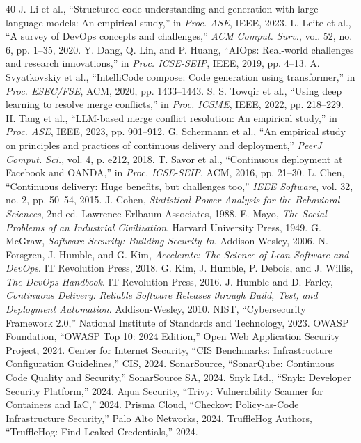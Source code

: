 \documentclass[journal]{IEEEtran}
\begin{document}
\begin{thebibliography}{40}
 J. Li et al., ``Structured code understanding and generation with large language models: An empirical study,'' in \textit{Proc. ASE}, IEEE, 2023.
 L. Leite et al., ``A survey of DevOps concepts and challenges,'' \textit{ACM Comput. Surv.}, vol. 52, no. 6, pp. 1--35, 2020.
 Y. Dang, Q. Lin, and P. Huang, ``AIOps: Real-world challenges and research innovations,'' in \textit{Proc. ICSE-SEIP}, IEEE, 2019, pp. 4--13.
 A. Svyatkovskiy et al., ``IntelliCode compose: Code generation using transformer,'' in \textit{Proc. ESEC/FSE}, ACM, 2020, pp. 1433--1443.
 S. S. Towqir et al., ``Using deep learning to resolve merge conflicts,'' in \textit{Proc. ICSME}, IEEE, 2022, pp. 218--229.
 H. Tang et al., ``LLM-based merge conflict resolution: An empirical study,'' in \textit{Proc. ASE}, IEEE, 2023, pp. 901--912.
 G. Schermann et al., ``An empirical study on principles and practices of continuous delivery and deployment,'' \textit{PeerJ Comput. Sci.}, vol. 4, p. e212, 2018.
 T. Savor et al., ``Continuous deployment at Facebook and OANDA,'' in \textit{Proc. ICSE-SEIP}, ACM, 2016, pp. 21--30.
 L. Chen, ``Continuous delivery: Huge benefits, but challenges too,'' \textit{IEEE Software}, vol. 32, no. 2, pp. 50--54, 2015.
 J. Cohen, \textit{Statistical Power Analysis for the Behavioral Sciences}, 2nd ed. Lawrence Erlbaum Associates, 1988.
 E. Mayo, \textit{The Social Problems of an Industrial Civilization}. Harvard University Press, 1949.
 G. McGraw, \textit{Software Security: Building Security In}. Addison-Wesley, 2006.
 N. Forsgren, J. Humble, and G. Kim, \textit{Accelerate: The Science of Lean Software and DevOps}. IT Revolution Press, 2018.
 G. Kim, J. Humble, P. Debois, and J. Willis, \textit{The DevOps Handbook}. IT Revolution Press, 2016.
 J. Humble and D. Farley, \textit{Continuous Delivery: Reliable Software Releases through Build, Test, and Deployment Automation}. Addison-Wesley, 2010.
 NIST, ``Cybersecurity Framework 2.0,'' National Institute of Standards and Technology, 2023.
 OWASP Foundation, ``OWASP Top 10: 2024 Edition,'' Open Web Application Security Project, 2024.
 Center for Internet Security, ``CIS Benchmarks: Infrastructure Configuration Guidelines,'' CIS, 2024.
 SonarSource, ``SonarQube: Continuous Code Quality and Security,'' SonarSource SA, 2024.
 Snyk Ltd., ``Snyk: Developer Security Platform,'' 2024.
 Aqua Security, ``Trivy: Vulnerability Scanner for Containers and IaC,'' 2024.
 Prisma Cloud, ``Checkov: Policy-as-Code Infrastructure Security,'' Palo Alto Networks, 2024.
 TruffleHog Authors, ``TruffleHog: Find Leaked Credentials,'' 2024.
\end{thebibliography}
\end{document}
